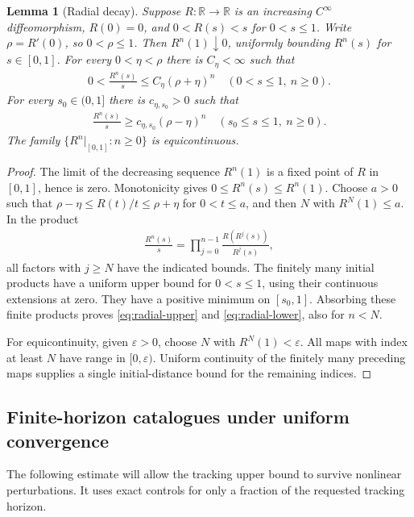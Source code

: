 \documentclass[11pt,a4paper]{article}
\newtheorem{lemma}[theorem]{Lemma}
\theoremstyle{definition}
\theoremstyle{remark}
\begin{document}
\begin{lemma}[Radial decay]\label{lem:radial}
Suppose \(R:\mathbb R\to\mathbb R\) is an increasing \(C^\infty\) diffeomorphism, \(R(0)=0\), and \(0<R(s)<s\) for \(0<s\leq1\). Write \(\rho=R'(0)\), so \(0<\rho\leq1\). Then \(R^n(1)\downarrow0\), uniformly bounding \(R^n(s)\) for \(s\in[0,1]\). For every \(0<\eta<\rho\) there is \(C_\eta<\infty\) such that
\begin{align}\label{eq:radial-upper}
 0<\frac{R^n(s)}s\leq C_\eta(\rho+\eta)^n
       \quad(0<s\leq1,\ n\geq0).
\end{align}
For every \(s_0\in(0,1]\) there is \(c_{\eta,s_0}>0\) such that
\begin{align}\label{eq:radial-lower}
 \frac{R^n(s)}s\geq c_{\eta,s_0}(\rho-\eta)^n
       \quad(s_0\leq s\leq1,\ n\geq0).
\end{align}
The family \(\{R^n|_{[0,1]}:n\geq0\}\) is equicontinuous.
\end{lemma}
\begin{proof}
The limit of the decreasing sequence \(R^n(1)\) is a fixed point of \(R\) in \([0,1]\), hence is zero. Monotonicity gives \(0\leq R^n(s)\leq R^n(1)\). Choose \(a>0\) such that
\(\rho-\eta\leq R(t)/t\leq\rho+\eta\) for \(0<t\leq a\), and then \(N\) with \(R^N(1)\leq a\). In the product
\begin{align*}
 \frac{R^n(s)}s
 =\prod_{j=0}^{n-1}\frac{R(R^j(s))}{R^j(s)},
\end{align*}
all factors with \(j\geq N\) have the indicated bounds. The finitely many initial products have a uniform upper bound for \(0<s\leq1\), using their continuous extensions at zero. They have a positive minimum on \([s_0,1]\). Absorbing these finite products proves \eqref{eq:radial-upper} and \eqref{eq:radial-lower}, also for \(n<N\).

For equicontinuity, given \(\varepsilon>0\), choose \(N\) with \(R^N(1)<\varepsilon\). All maps with index at least \(N\) have range in \([0,\varepsilon)\). Uniform continuity of the finitely many preceding maps supplies a single initial-distance bound for the remaining indices.
\end{proof}

\subsection{Finite-horizon catalogues under uniform convergence}

The following estimate will allow the tracking upper bound to survive nonlinear perturbations. It uses exact controls for only a fraction of the requested tracking horizon.
\end{document}
